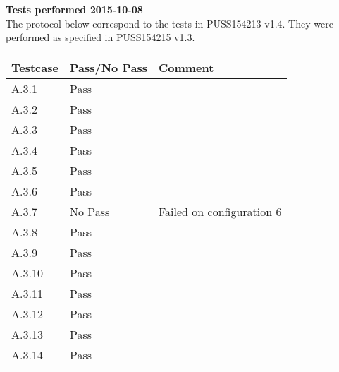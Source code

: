 \renewcommand{\testdate}{2015-10-08}
\textbf{ Tests performed \testdate} \\
The protocol below correspond to the tests in PUSS154213 v1.4. They were performed as specified in PUSS154215 v1.3.
\begin{center}
  	\begin{tabular}{| p{3cm} | p{5cm} | p{5cm} |}
    		\hline
	    	\textbf{Testcase}			& \textbf{Pass/No Pass} 	& \textbf{Comment} \\ \hline
    		A.3.1		 						& Pass 										&  				\\ \hline
    		A.3.2		 						& Pass 										& 				 \\	\hline
    		A.3.3		 						& Pass 										& 				 \\	\hline
    		A.3.4		 						& Pass 										& 				 \\	\hline
    		A.3.5		 						& Pass 										& 				 \\	\hline
    		A.3.6		 						& Pass 										& 				 \\	\hline
    		A.3.7		 						& No Pass 										& Failed on configuration 6				 \\	\hline
    		A.3.8		 						& Pass 										& 				 \\	\hline
    		A.3.9		 						& Pass 										& 				 \\	\hline
    		A.3.10	 							& Pass 										& 				 \\	\hline
    		A.3.11	 							& Pass 										& 				 \\	\hline
    		A.3.12	 							& Pass 										& 				 \\	\hline
    		A.3.13	 							& Pass 										& 				 \\	\hline
    		A.3.14	 							& Pass 										& 				 \\	\hline
 	\end{tabular}
\end{center}